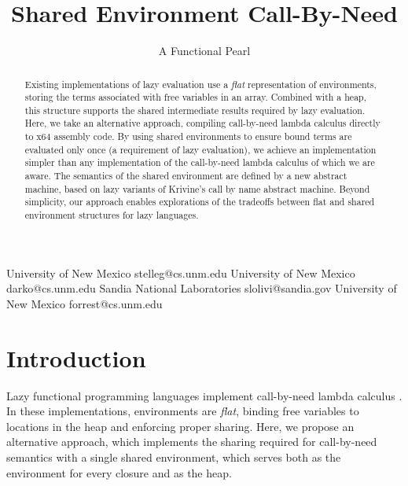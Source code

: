 \documentclass[preprint]{sigplanconf}
\begin{document}
\title{Shared Environment Call-By-Need}
\subtitle{A Functional Pearl}

           {University of New Mexico}
           {stelleg@cs.unm.edu}
           {University of New Mexico}
           {darko@cs.unm.edu}
           {Sandia National Laboratories}
           {slolivi@sandia.gov}
           {University of New Mexico}
           {forrest@cs.unm.edu}

\maketitle

\begin{abstract}
  Existing implementations of lazy evaluation use a \emph{flat}
  representation of environments, storing the terms associated with
  free variables in an array.  Combined with a heap, this structure
  supports the shared intermediate results required by lazy
  evaluation.  Here, we take an alternative approach, compiling
  call-by-need lambda calculus directly to x64 assembly code.  By
  using shared environments to ensure bound terms are evaluated only
  once (a requirement of lazy evaluation), we achieve an
  implementation simpler than any implementation of the
  call-by-need lambda calculus of which we are aware. The semantics
  of the shared environment are defined by a new abstract machine, based on
  lazy variants of Krivine's call by name abstract machine. Beyond simplicity,
  our approach enables explorations of the tradeoffs between flat and shared
  environment structures for lazy languages.

\end{abstract}

\section{Introduction} \label{sec:intro}

Lazy functional programming languages implement call-by-need lambda calculus
\cite{ariola1995call}. In these implementations, environments are \emph{flat},
binding free variables to locations in the heap and enforcing proper sharing.
Here, we propose an alternative approach, which implements the sharing required
for call-by-need semantics with a single shared environment, which serves both
as the environment for every closure and as the heap. 
\end{document}
